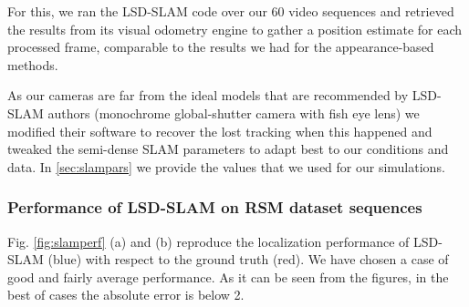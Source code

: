 For this, we ran the LSD-SLAM code over our 60 video sequences and retrieved the results from its visual odometry engine to gather a position estimate for each processed frame, comparable to the results we had for the appearance-based methods. 

As our cameras are far from the ideal models that are recommended by LSD-SLAM authors (monochrome global-shutter camera with fish eye lens) we modified their software to recover the lost tracking when this happened and tweaked the semi-dense SLAM parameters to adapt best to our conditions and data. In \ref{sec:slampars} we provide the values that we used for our simulations.

\subsubsection{Performance of LSD-SLAM on RSM dataset sequences}

Fig. \ref{fig:slamperf} (a) and (b) reproduce the localization performance of LSD-SLAM (blue) with respect to the ground truth (red). We have chosen a case of good and fairly average performance. As it can be seen from the figures, in the best of cases the absolute error is below 2. 

